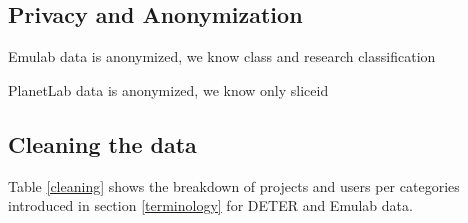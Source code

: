 \subsection{Privacy and Anonymization} 
Emulab data is anonymized, we know class and research classification 

PlanetLab data is anonymized, we know only sliceid 





\subsection{Cleaning the data}

Table \ref{cleaning} shows the breakdown of projects and users per
categories introduced in section \ref{terminology} for DETER and Emulab
data.

